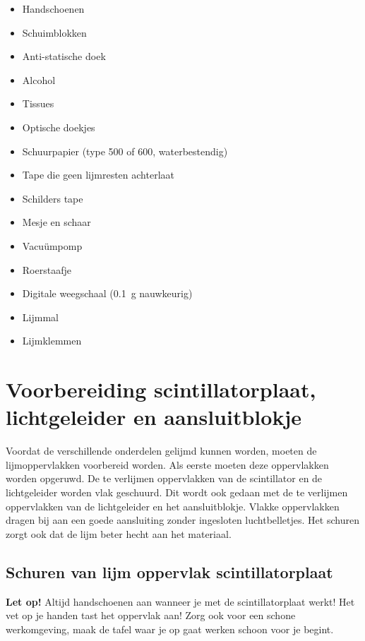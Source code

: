 \begin{itemize}
    \item Handschoenen
    \item Schuimblokken
    \item Anti-statische doek
    \item Alcohol
    \item Tissues
    \item Optische doekjes
    \item Schuurpapier (type 500 of 600, waterbestendig)
    \item Tape die geen lijmresten achterlaat
    \item Schilders tape
    \item Mesje en schaar
    \item Vacuümpomp
    \item Roerstaafje
    \item Digitale weegschaal (\SI{0.1}{\gram} nauwkeurig)
    \item Lijmmal
    \item Lijmklemmen
\end{itemize}


\section{Voorbereiding scintillatorplaat, lichtgeleider en aansluitblokje}

Voordat de verschillende onderdelen gelijmd kunnen worden, moeten de lijmoppervlakken voorbereid worden. Als eerste moeten deze oppervlakken worden opgeruwd. De te verlijmen oppervlakken van de scintillator en de lichtgeleider worden vlak geschuurd. Dit wordt ook gedaan met de te verlijmen oppervlakken van de lichtgeleider en het aansluitblokje. Vlakke oppervlakken dragen bij aan een goede aansluiting zonder ingesloten luchtbelletjes. Het schuren zorgt ook dat de lijm beter hecht aan het materiaal. 


\subsection{Schuren van lijm oppervlak scintillatorplaat}

\textbf{Let op!} Altijd handschoenen aan wanneer je met de
scintillatorplaat werkt! Het vet op je handen tast het oppervlak aan! Zorg ook voor een schone werkomgeving, maak de tafel waar je op gaat werken schoon voor je begint.

